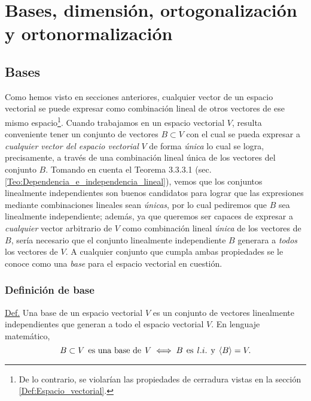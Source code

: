 \documentclass[12pt]{article}
\begin{document}
\newpage
\section{Bases, dimensión, ortogonalización y ortonormalización}

\subsection{Bases}

Como hemos visto en secciones anteriores, cualquier vector de un espacio vectorial se puede expresar como combinación lineal de otros vectores de ese mismo espacio\footnote{De lo contrario, se violarían las propiedades de cerradura vistas en la sección \ref{Def:Espacio_vectorial}.}. Cuando trabajamos en un espacio vectorial $V$, resulta conveniente tener un conjunto de vectores $B\subset V$ con el cual se pueda expresar a \emph{cualquier vector del espacio vectorial} $V$ de forma \emph{única} \textemdash lo cual se logra, precisamente, a través de una combinación lineal única de los vectores del conjunto $B$. Tomando en cuenta el Teorema 3.3.3.1 (sec. \ref{Teo:Dependencia_e_independencia_lineal}), vemos que los conjuntos linealmente independientes son buenos candidatos para lograr que las expresiones mediante combinaciones lineales sean \emph{únicas}, por lo cual pediremos que $B$ sea linealmente independiente; además, ya que queremos ser capaces de expresar a \emph{cualquier} vector arbitrario de $V$ como combinación lineal \emph{única} de los vectores de $B$, sería necesario que el conjunto linealmente independiente $B$ generara a \emph{todos} los vectores de $V$. A cualquier conjunto que cumpla ambas propiedades se le conoce como una \emph{base} para el espacio vectorial en cuestión.

\subsubsection{Definición de base} \label{Def:Base}

\begin{tcolorbox}

    \underline{Def.} Una base de un espacio vectorial $V$ es un conjunto de vectores linealmente independientes que generan a todo el espacio vectorial $V$. En lenguaje matemático, $$B\subset V \hspace{1.5mm}\text{es una base de}\hspace{1.5mm} V \iff B\hspace{1.5mm}\text{es}\hspace{1.5mm} l.i.  \hspace{1.5mm}\text{y}\hspace{1.5mm} \langle B \rangle=V.$$

\end{tcolorbox}
\end{document}
